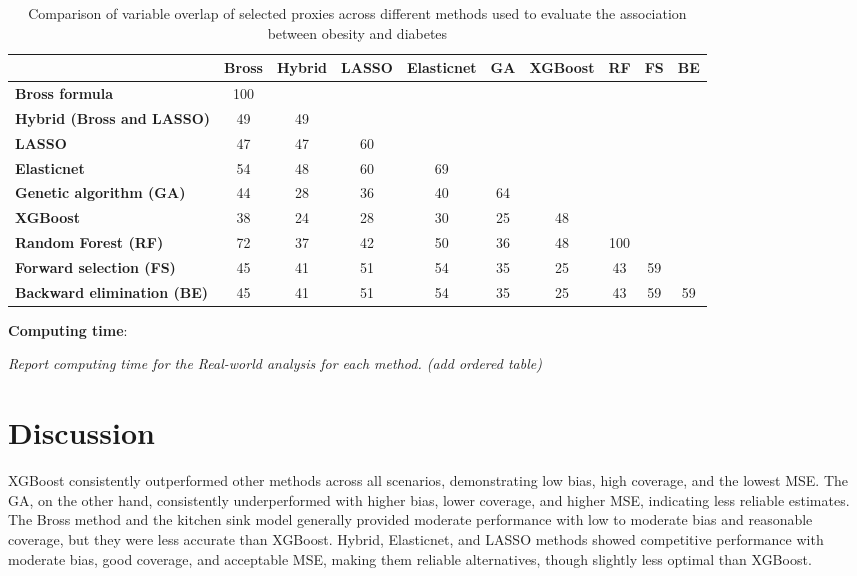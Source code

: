 \documentclass[sn-vancouver,Numbered,lineno,pdflatex]{sn-jnl}
\begin{document}
\begin{table}[htbp]
\centering
\caption{Comparison of variable overlap of selected proxies across different methods used to evaluate the association between obesity and diabetes}
\label{tab:method-comparison}
\begin{tabular}{lccccccccc}
\toprule
 & \textbf{Bross} & \textbf{Hybrid} & \textbf{LASSO} & \textbf{Elasticnet} & \textbf{GA} & \textbf{XGBoost} & \textbf{RF} & \textbf{FS} & \textbf{BE} \\
\midrule
\textbf{Bross formula} & 100 & & & & & & & & \\
\textbf{Hybrid (Bross and LASSO)} & 49 & 49 & & & & & & & \\
\textbf{LASSO} & 47 & 47 & 60 & & & & & & \\
\textbf{Elasticnet} & 54 & 48 & 60 & 69 & & & & & \\
\textbf{Genetic algorithm (GA)} & 44 & 28 & 36 & 40 & 64 & & & & \\
\textbf{XGBoost} & 38 & 24 & 28 & 30 & 25 & 48 & & & \\
\textbf{Random Forest (RF)} & 72 & 37 & 42 & 50 & 36 & 48 & 100 & & \\
\textbf{Forward selection (FS)} & 45 & 41 & 51 & 54 & 35 & 25 & 43 & 59 & \\
\textbf{Backward elimination (BE)} & 45 & 41 & 51 & 54 & 35 & 25 & 43 & 59 & 59 \\
\bottomrule
\end{tabular}
\end{table}

\textbf{Computing time}:

\emph{Report computing time for the Real-world analysis for each method.
(add ordered table)}

\section{Discussion}\label{discussion}

XGBoost consistently outperformed other methods across all scenarios,
demonstrating low bias, high coverage, and the lowest MSE. The GA, on
the other hand, consistently underperformed with higher bias, lower
coverage, and higher MSE, indicating less reliable estimates. The Bross
method and the kitchen sink model generally provided moderate
performance with low to moderate bias and reasonable coverage, but they
were less accurate than XGBoost. Hybrid, Elasticnet, and LASSO methods
showed competitive performance with moderate bias, good coverage, and
acceptable MSE, making them reliable alternatives, though slightly less
optimal than XGBoost.
\end{document}
